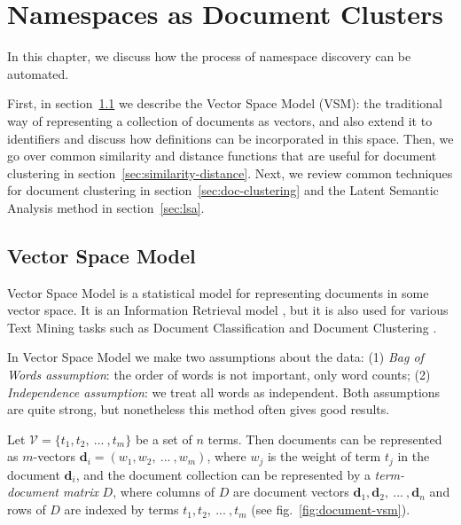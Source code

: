 \section{Namespaces as Document Clusters} \label{sec:namespaces-top}


In this chapter, we discuss how the process of namespace discovery
can be automated.

First, in section~\ref{sec:vsm} we describe the Vector Space Model (VSM): 
the traditional way of representing a collection of documents as vectors,
and also extend it to identifiers and discuss how definitions can
be incorporated in this space. 
Then, we go over common similarity and distance functions that are useful
for document clustering in section~\ref{sec:similarity-distance}. 
Next, we review common techniques for document clustering in section~\ref{sec:doc-clustering}
and the Latent Semantic Analysis method in section~\ref{sec:lsa}.


\subsection{Vector Space Model} \label{sec:vsm}

Vector Space Model is a statistical model for representing documents
in some vector space. It is an Information Retrieval
model \cite{manning2008introduction}, but it is also used for various
Text Mining tasks such as Document Classification \cite{sebastiani2002machine}
and Document Clustering \cite{oikonomakou2005review} \cite{aggarwal2012survey}.

In Vector Space Model we make two assumptions about the data:
(1) \emph{Bag of Words assumption}: the order of words is not important,
only word counts;
(2) \emph{Independence assumption}: we treat all words as independent.
Both assumptions are quite strong, but nonetheless this method often
gives good results.

Let $\mathcal V = \{t_1, t_2, \ ... \ , t_m \}$ be a set of $n$ terms.
Then documents can be represented as $m$-vectors
$\mathbf d_i = (w_1, w_2, \ ... \ , w_m)$, where $w_j$ is the weight
of term $t_j$ in the document $\mathbf d_i$,
and the document collection can be represented by a \emph{term-document matrix}
$D$, where columns of $D$ are document vectors
$\mathbf d_1, \mathbf d_2, \ ... \ , \mathbf d_n$
and rows of $D$ are indexed by terms $t_1, t_2, \ ... \ , t_m$
(see fig.~\ref{fig:document-vsm}).

